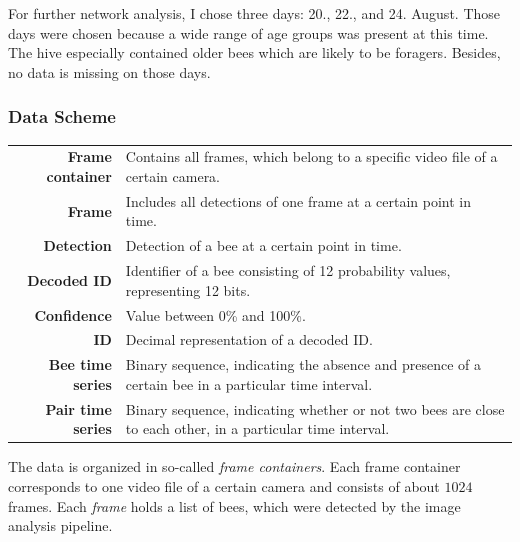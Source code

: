 For further network analysis, I chose three days: 20., 22., and 24. August.
Those days were chosen because a wide range of age groups was present at this time. The hive especially contained older bees which are likely to be foragers. Besides, no data is missing on those days.


\subsubsection{Data Scheme}
\label{subsec:datascheme}

\begin{table}[!t]
\colorbox{usethiscolorhere}{
\centering
\begin{tabularx}{\textwidth}{@{} r Y @{}}
	\textbf{Frame container} &
	Contains all frames, which belong to a specific video file of a certain camera.\\
	\textbf{Frame} &
	Includes all detections of one frame at a certain point in time.\\
	\textbf{Detection} &
	Detection of a bee at a certain point in time.\\
	\textbf{Decoded ID} &
	Identifier of a bee consisting of 12 probability values, representing 12 bits.\\
	\textbf{Confidence} &
	Value between 0\% and 100\%.\\
	\textbf{ID} &
	Decimal representation of a decoded ID.\\
	\textbf{Bee time series} & Binary sequence, indicating the absence and presence of a certain bee in a particular time interval.\\
	\textbf{Pair time series} & Binary sequence, indicating whether or not two bees are close to each other, in a particular time interval.\\
\end{tabularx}
}
\end{table}

The data is organized in so-called \emph{frame containers}.
Each frame container corresponds to one video file of a certain camera and consists of about $1024$ frames.
Each \emph{frame} holds a list of bees, which were detected by the image analysis pipeline.

